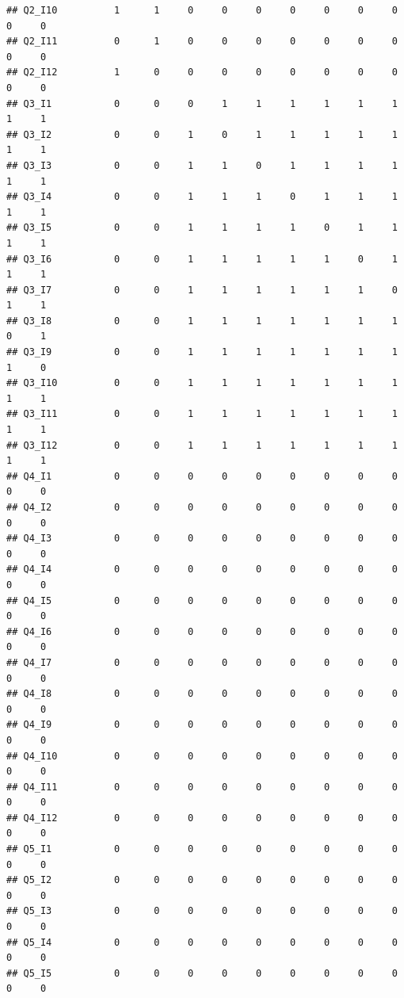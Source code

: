 \documentclass[
]{book}
\begin{document}
\begin{verbatim}
## Q2_I10          1      1     0     0     0     0     0     0     0     0     0
## Q2_I11          0      1     0     0     0     0     0     0     0     0     0
## Q2_I12          1      0     0     0     0     0     0     0     0     0     0
## Q3_I1           0      0     0     1     1     1     1     1     1     1     1
## Q3_I2           0      0     1     0     1     1     1     1     1     1     1
## Q3_I3           0      0     1     1     0     1     1     1     1     1     1
## Q3_I4           0      0     1     1     1     0     1     1     1     1     1
## Q3_I5           0      0     1     1     1     1     0     1     1     1     1
## Q3_I6           0      0     1     1     1     1     1     0     1     1     1
## Q3_I7           0      0     1     1     1     1     1     1     0     1     1
## Q3_I8           0      0     1     1     1     1     1     1     1     0     1
## Q3_I9           0      0     1     1     1     1     1     1     1     1     0
## Q3_I10          0      0     1     1     1     1     1     1     1     1     1
## Q3_I11          0      0     1     1     1     1     1     1     1     1     1
## Q3_I12          0      0     1     1     1     1     1     1     1     1     1
## Q4_I1           0      0     0     0     0     0     0     0     0     0     0
## Q4_I2           0      0     0     0     0     0     0     0     0     0     0
## Q4_I3           0      0     0     0     0     0     0     0     0     0     0
## Q4_I4           0      0     0     0     0     0     0     0     0     0     0
## Q4_I5           0      0     0     0     0     0     0     0     0     0     0
## Q4_I6           0      0     0     0     0     0     0     0     0     0     0
## Q4_I7           0      0     0     0     0     0     0     0     0     0     0
## Q4_I8           0      0     0     0     0     0     0     0     0     0     0
## Q4_I9           0      0     0     0     0     0     0     0     0     0     0
## Q4_I10          0      0     0     0     0     0     0     0     0     0     0
## Q4_I11          0      0     0     0     0     0     0     0     0     0     0
## Q4_I12          0      0     0     0     0     0     0     0     0     0     0
## Q5_I1           0      0     0     0     0     0     0     0     0     0     0
## Q5_I2           0      0     0     0     0     0     0     0     0     0     0
## Q5_I3           0      0     0     0     0     0     0     0     0     0     0
## Q5_I4           0      0     0     0     0     0     0     0     0     0     0
## Q5_I5           0      0     0     0     0     0     0     0     0     0     0

\end{verbatim}
\end{document}
